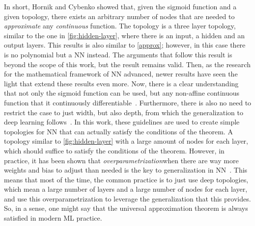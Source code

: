 In short, Hornik and Cybenko showed that, given the sigmoid function and a given topology, 
there exists an arbitrary number of nodes that are needed to \emph{approximate} any 
\emph{continuous} function. The topology is a three layer topology, similar to the one in 
\autoref{fig:hidden-layer}, where there is an input, a hidden and an output layers. This 
results is also similar to \autoref{approx}; however, in this case there is no polynomial 
but a NN instead. The arguments that follow this result is beyond the scope of this work, 
but the result remains valid. Then, as the research for the mathematical framework of NN 
advanced, newer results have seen the light that extend these results even more. Now, there 
is a clear understanding that not only the sigmoid function can be used, but any non-affine 
continuous function that it continuously differentiable~\cite{parkMinimumWidthUniversal2020}. Furthermore, there is also no need to restrict the case to just width, but also depth, 
from which the generalization to deep learning 
follows~\cite{zhouUniversalityDeepConvolutional2020,bernerModernMathematicsDeep2021}.
In this work, these guidelines are used to create simple topologies for NN that can 
actually satisfy the conditions of the theorem. A topology similar to 
\autoref{fig:hidden-layer} with a large amount of nodes for each layer, which should 
suffice to satisfy the conditions of the theorem. However, in practice, it has been shown 
that \emph{overparametrization}\textemdash when there are way more weights and bias to adjust than needed \textemdash is the key to generalization in 
NN~\cite{neyshaburRoleOverparametrizationGeneralization2018,cohenLearningCurvesOverparametrized2021}.
This means that most of the time, the common practice is to just use deep topologies, which 
mean a large number of layers and a large number of nodes for each layer, and use this 
overparametrization to leverage the generalization that this provides. So, in a sense, one 
might say that the universal approximation theorem is always satisfied in modern ML practice.


